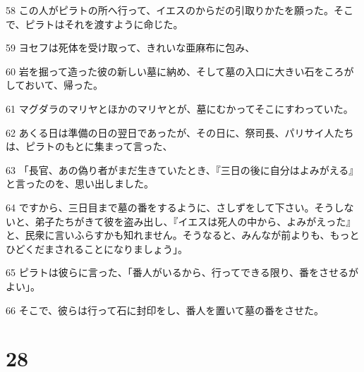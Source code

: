 \par 58 この人がピラトの所へ行って、イエスのからだの引取りかたを願った。そこで、ピラトはそれを渡すように命じた。
\par 59 ヨセフは死体を受け取って、きれいな亜麻布に包み、
\par 60 岩を掘って造った彼の新しい墓に納め、そして墓の入口に大きい石をころがしておいて、帰った。
\par 61 マグダラのマリヤとほかのマリヤとが、墓にむかってそこにすわっていた。
\par 62 あくる日は準備の日の翌日であったが、その日に、祭司長、パリサイ人たちは、ピラトのもとに集まって言った、
\par 63 「長官、あの偽り者がまだ生きていたとき、『三日の後に自分はよみがえる』と言ったのを、思い出しました。
\par 64 ですから、三日目まで墓の番をするように、さしずをして下さい。そうしないと、弟子たちがきて彼を盗み出し、『イエスは死人の中から、よみがえった』と、民衆に言いふらすかも知れません。そうなると、みんなが前よりも、もっとひどくだまされることになりましょう」。
\par 65 ピラトは彼らに言った、「番人がいるから、行ってできる限り、番をさせるがよい」。
\par 66 そこで、彼らは行って石に封印をし、番人を置いて墓の番をさせた。

\chapter{28}

